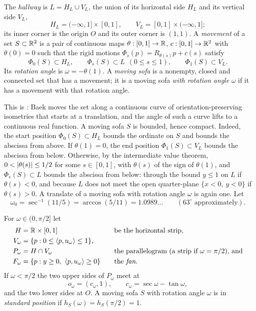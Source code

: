 \begin{definition}\label{def:sofa}
The \emph{hallway} is $L=H_L\cup V_L$, the union of its horizontal side $H_L$
and its vertical side $V_L$,
\[
  H_L=(-\infty,1]\times[0,1],\qquad V_L=[0,1]\times(-\infty,1];
\]
its inner corner is the origin $O$ and its outer corner is $(1,1)$. A
\emph{movement} of a set $S\subset\mathbb{R}^2$ is a pair of continuous maps
$\theta:[0,1]\to\mathbb{R}$, $c:[0,1]\to\mathbb{R}^2$ with $\theta(0)=0$ such that the rigid
motions $\Phi_s(p)=R_{\theta(s)}p+c(s)$ satisfy
\[
  \Phi_0(S)\subset H_L,\qquad \Phi_s(S)\subset L\ \ (0\le s\le1),
    \qquad \Phi_1(S)\subset V_L .
\]
Its \emph{rotation angle} is $\omega=-\theta(1)$. A \emph{moving sofa} is a
nonempty, closed and connected set that has a movement; it is a moving sofa
\emph{with rotation angle $\omega$} if it has a movement with that rotation
angle.
\end{definition}

This is : Baek moves the set along a continuous curve of
orientation-preserving isometries that starts at a translation, and the angle of
such a curve lifts to a continuous real function. A moving sofa $S$ is bounded,
hence compact. Indeed, the start position $\Phi_0(S)\subset H_L$ bounds the
ordinate on $S$ and bounds the abscissa from above. If $\theta(1)=0$, the end
position $\Phi_1(S)\subset V_L$ bounds the abscissa from below. Otherwise, by
the intermediate value theorem, $0<\lvert \theta(s)\rvert\le1/2$ for some $s\in[0,1]$,
with $\theta(s)$ of the sign of $\theta(1)$, and $\Phi_s(S)\subset L$ bounds the
abscissa from below: through the bound $y\le1$ on $L$ if $\theta(s)<0$, and
because $L$ does not meet the open quarter-plane $\{x<0,\ y<0\}$ if
$\theta(s)>0$. A translate of a moving sofa with rotation angle $\omega$ is
again one. Let
\[
  \omega_0=\sec^{-1}(11/5)=\arccos(5/11)=1.0989\ldots\qquad
  (63^\circ\text{ approximately}).
\]

\begin{definition}\label{def:standard}
For $\omega\in(0,\pi/2]$ let
\begin{alignat*}{2}
  H&=\mathbb{R}\times[0,1]&\quad&\text{be the horizontal strip,}\\
  V_\omega&=\{p:0\le\langle p,u_\omega\rangle\le1\},\\
  P_\omega&=H\cap V_\omega&&\text{the parallelogram (a strip if $\omega=\pi/2$),
    and}\\
  F_\omega&=\{p:y\ge0,\ \langle p,u_\omega\rangle\ge0\}&&\text{the \emph{fan}.}
\end{alignat*}
If $\omega<\pi/2$ the two upper sides of $P_\omega$ meet at
\[
  o_\omega=(c_\omega,1),\qquad c_\omega=\sec\omega-\tan\omega,
\]
and the two lower sides at $O$. A moving sofa $S$ with rotation angle $\omega$
is in \emph{standard position} if $h_S(\omega)=h_S(\pi/2)=1$.
\end{definition}

